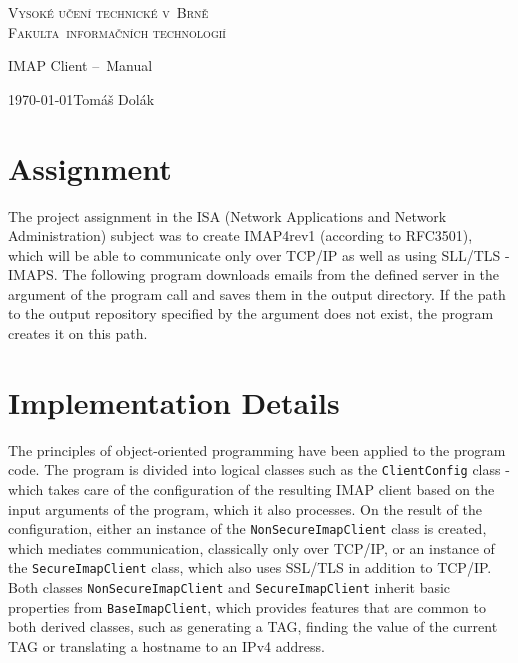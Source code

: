 \documentclass[a4paper,11pt]{article}
\begin{document}
\begin{titlepage}
    \begin{center}
        
        \Huge
        \textsc{Vysoké učení technické v~Brně}\\[0.1em]
        
        \huge
        \textsc{Fakulta~informačních technologií}
        
        
        \LARGE
        IMAP Client --\ Manual \\[-0.1em]

    \end{center}
    
    {\Large \today \hfill Tomáš Dolák}
\end{titlepage}

\newpage
\tableofcontents

\newpage
\label{firstpage}
\section{Assignment}
The project assignment in the ISA (Network Applications and Network Administration) subject was 
to create IMAP4rev1 (according to RFC3501), which will be able to communicate only over TCP/IP as well 
as using SLL/TLS - IMAPS. The following program downloads emails from the defined server in the argument 
of the program call and saves them in the output directory. If the path to the output repository 
specified by the argument does not exist, the program creates it on this path.

\section{Implementation Details}
The principles of object-oriented programming have been applied to the program code. The program is 
divided into logical classes such as the \verb!ClientConfig! class - which takes care of the configuration 
of the resulting IMAP client based on the input arguments of the program, which it also processes. 
On the result of the configuration, either an instance of the \verb!NonSecureImapClient! class is created, 
which mediates communication, classically only over TCP/IP, or an instance of the \verb!SecureImapClient! 
class, which also uses SSL/TLS in addition to TCP/IP. Both classes \verb!NonSecureImapClient! and 
\verb!SecureImapClient! inherit basic properties from \verb!BaseImapClient!, which provides features 
that are common to both derived classes, such as generating a TAG, finding the value of the current TAG or translating 
a hostname to an IPv4 address. 
\end{document}
